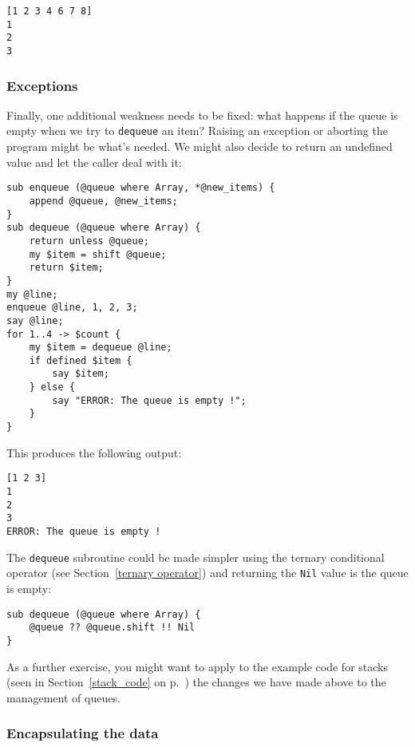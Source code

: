 \begin{verbatim}
[1 2 3 4 6 7 8]
1
2
3
\end{verbatim}

\subsubsection{Exceptions}

Finally, one additional weakness needs to be fixed: what 
happens if the queue is empty when we try to {\tt dequeue} 
an item? Raising an exception or aborting the program 
might be what's needed. We might also decide to return an 
undefined value and let the caller deal with it:

\begin{verbatim}
sub enqueue (@queue where Array, *@new_items) {
    append @queue, @new_items;
}
sub dequeue (@queue where Array) {
    return unless @queue;
    my $item = shift @queue;
    return $item;
}
my @line;
enqueue @line, 1, 2, 3;
say @line;
for 1..4 -> $count {
    my $item = dequeue @line;
    if defined $item {
        say $item;
    } else {
        say "ERROR: The queue is empty !";
    }
}
\end{verbatim}

This produces the following output:

\begin{verbatim}
[1 2 3]
1
2
3
ERROR: The queue is empty !
\end{verbatim}

The {\tt dequeue} subroutine could be made simpler using 
the ternary conditional operator (see 
Section~\ref{ternary operator}) and returning the {\tt Nil} 
value is the queue is empty:

\begin{verbatim}
sub dequeue (@queue where Array) {
    @queue ?? @queue.shift !! Nil
}
\end{verbatim}


As a further exercise, you might want to apply to the 
example code for stacks (seen in Section~\ref{stack_code} 
on p.~\pageref{stack_code}) the changes we have made 
above to the management of queues.

\subsubsection{Encapsulating the data}
\label{functional_queue}

